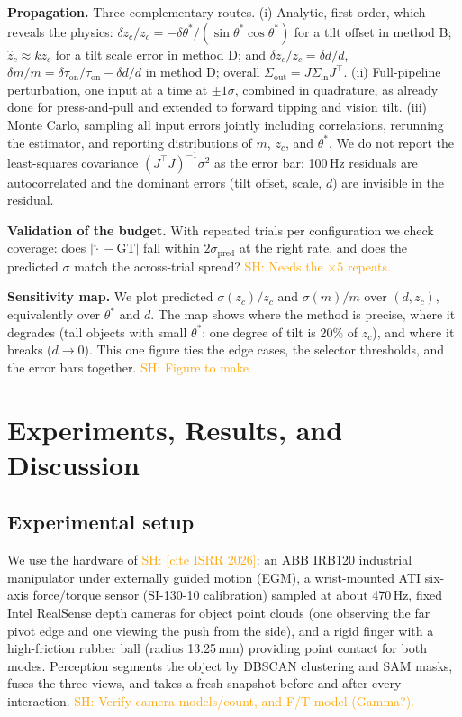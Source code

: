 \documentclass[10pt, conference]{IEEEtran}
\newcommand{\sh}[1]{\textcolor{orange}{SH: #1}}
\newcommand{\isrr}{\sh{[cite ISRR 2026]}}
\begin{document}
\noindent \textbf{Propagation.} Three complementary routes. (i) Analytic, first order, which reveals the physics: $\delta z_c/z_c = -\delta\theta^{*}/(\sin\theta^{*}\cos\theta^{*})$ for a tilt offset in method B; $\hat z_c \approx k z_c$ for a tilt scale error in method D; and $\delta z_c/z_c = \delta d/d$, $\delta m/m = \delta\tau_{\mathrm{on}}/\tau_{\mathrm{on}} - \delta d/d$ in method D; overall $\Sigma_{\mathrm{out}} = J\Sigma_{\mathrm{in}}J^\top$. (ii) Full-pipeline perturbation, one input at a time at $\pm1\sigma$, combined in quadrature, as already done for press-and-pull and extended to forward tipping and vision tilt. (iii) Monte Carlo, sampling all input errors jointly including correlations, rerunning the estimator, and reporting distributions of $m$, $z_c$, and $\theta^{*}$. We do not report the least-squares covariance $(J^\top J)^{-1}\sigma^2$ as the error bar: 100\,Hz residuals are autocorrelated and the dominant errors (tilt offset, scale, $d$) are invisible in the residual.

\noindent \textbf{Validation of the budget.} With repeated trials per configuration we check coverage: does $|\hat\cdot - \mathrm{GT}|$ fall within $2\sigma_{\mathrm{pred}}$ at the right rate, and does the predicted $\sigma$ match the across-trial spread? \sh{Needs the $\times5$ repeats.}

\noindent \textbf{Sensitivity map.} We plot predicted $\sigma(z_c)/z_c$ and $\sigma(m)/m$ over $(d, z_c)$, equivalently over $\theta^{*}$ and $d$. The map shows where the method is precise, where it degrades (tall objects with small $\theta^{*}$: one degree of tilt is 20\% of $z_c$), and where it breaks ($d \to 0$). This one figure ties the edge cases, the selector thresholds, and the error bars together. \sh{Figure to make.}

\section{Experiments, Results, and Discussion} \label{sec:results}

\subsection{Experimental setup}
We use the hardware of \isrr{}: an ABB IRB120 industrial manipulator under externally guided motion (EGM), a wrist-mounted ATI six-axis force/torque sensor (SI-130-10 calibration) sampled at about 470\,Hz, fixed Intel RealSense depth cameras for object point clouds (one observing the far pivot edge and one viewing the push from the side), and a rigid finger with a high-friction rubber ball (radius 13.25\,mm) providing point contact for both modes. Perception segments the object by DBSCAN clustering and SAM masks, fuses the three views, and takes a fresh snapshot before and after every interaction. \sh{Verify camera models/count, and F/T model (Gamma?).}
\end{document}
